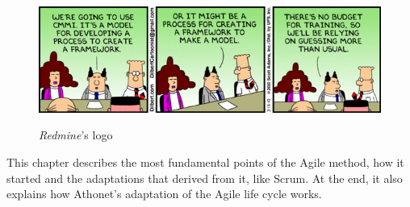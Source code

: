 \begin{figure}[H]
	\centering
	\includegraphics[width=\textwidth]{resources/BffFTn_CAAAEvGn}\\
	\caption{\textit{Redmine}'s logo}
\end{figure}
This chapter describes the most fundamental points of the Agile method, how it started and the adaptations that derived from it, like Scrum.
At the end, it also explains how Athonet's adaptation of the Agile life cycle works.

